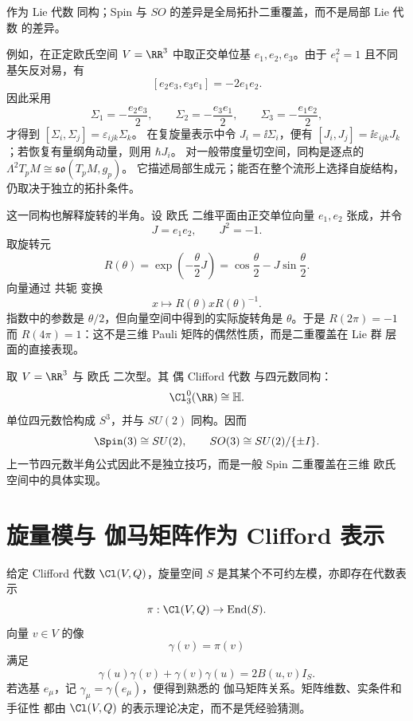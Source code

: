 作为 Lie 代数 同构；Spin 与 $SO$ 的差异是全局拓扑二重覆盖，而不是局部 Lie 代数 的差异。

例如，在正定欧氏空间 $V=\RR^3$ 中取正交单位基 $e_1,e_2,e_3$。由于 $e_i^2=1$ 且不同基矢反对易，有
\[
 [e_2e_3,e_3e_1]=-2e_1e_2.
\]
因此采用
\[
 \Sigma_1=-\frac{e_2e_3}{2},\qquad
 \Sigma_2=-\frac{e_3e_1}{2},\qquad
 \Sigma_3=-\frac{e_1e_2}{2},
\]
才得到 $[\Sigma_i,\Sigma_j]=\varepsilon_{ijk}\Sigma_k$。
在复旋量表示中令 $J_i=\ii\Sigma_i$，便有
$[J_i,J_j]=\ii\varepsilon_{ijk}J_k$；若恢复有量纲角动量，则用 $\hbar J_i$。
对一般带度量切空间，同构是逐点的 $\Lambda^2T_pM\cong\mathfrak{so}(T_pM,g_p)$。
它描述局部生成元；能否在整个流形上选择自旋结构，仍取决于独立的拓扑条件。

这一同构也解释旋转的半角。设 欧氏 二维平面由正交单位向量 $e_1,e_2$ 张成，并令
\[
J=e_1e_2,
\qquad J^2=-1.
\]
取旋转元
\begin{equation*}R(\theta)=\exp\!\left(-\frac{\theta}{2}J\right)
=\cos\frac\theta2-J\sin\frac\theta2.\end{equation*}
向量通过 共轭 变换
\[
x\longmapsto R(\theta)xR(\theta)^{-1}.
\]
指数中的参数是 $\theta/2$，但向量空间中得到的实际旋转角是 $\theta$。于是 $R(2\pi)=-1$ 而 $R(4\pi)=1$：这不是三维 Pauli 矩阵的偶然性质，而是二重覆盖在 Lie 群 层面的直接表现。

取 $V=\RR^3$ 与 欧氏 二次型。其 偶 Clifford 代数 与四元数同构：
\[
\Cl^0_3(\RR)\cong\mathbb H.
\]
单位四元数恰构成 $S^3$，并与 $SU(2)$ 同构。因而
\[
\Spin(3)
\cong SU(2),
\qquad
SO(3)\cong SU(2)/\{\pm I\}.
\]
上一节四元数半角公式因此不是独立技巧，而是一般 Spin 二重覆盖在三维 欧氏 空间中的具体实现。

\section{旋量模与 伽马矩阵作为 Clifford 表示}
\label{sec:spinor-gamma}
给定 Clifford 代数 $\Cl(V,Q)$，旋量空间 $S$ 是其某个不可约左模，亦即存在代数表示
\[
\pi:\Cl(V,Q)\to\operatorname{End}(S).
\]
向量 $v\in V$ 的像
\[
\gamma(v)=\pi(v)
\]
满足
\begin{equation*}\gamma(u)\gamma(v)+\gamma(v)\gamma(u)
=2B(u,v)I_S.\end{equation*}
若选基 $e_\mu$，记 $\gamma_\mu=\gamma(e_\mu)$，便得到熟悉的 伽马矩阵关系。矩阵维数、实条件和 手征性 都由 $\Cl(V,Q)$ 的表示理论决定，而不是凭经验猜测。

